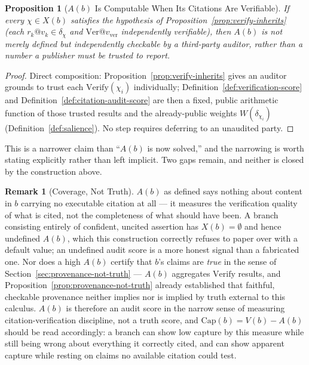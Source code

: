 \documentclass[11pt]{article}
\newtheorem{proposition}[theorem]{Proposition}
\theoremstyle{definition}
\newtheorem{remark}[theorem]{Remark}
\begin{document}
\begin{proposition}[$A(b)$ Is Computable When Its Citations Are Verifiable]
\label{prop:audit-computable}
If every $\chi \in X(b)$ satisfies the hypothesis of Proposition~\ref{prop:verify-inherits} (each $r_k@v_k \in \delta_\chi$ and $\mathrm{Ver}@v_{\mathrm{ver}}$ independently verifiable), then $A(b)$ is not merely defined but independently checkable by a third-party auditor, rather than a number a publisher must be trusted to report.
\end{proposition}
\begin{proof}
Direct composition: Proposition~\ref{prop:verify-inherits} gives an auditor grounds to trust each $\mathrm{Verify}(\chi_i)$ individually; Definition~\ref{def:verification-score} and Definition~\ref{def:citation-audit-score} are then a fixed, public arithmetic function of those trusted results and the already-public weights $W(\delta_{\chi_i})$ (Definition~\ref{def:salience}). No step requires deferring to an unaudited party.
\end{proof}

This is a narrower claim than ``$A(b)$ is now solved,'' and the narrowing is worth stating explicitly rather than left implicit. Two gaps remain, and neither is closed by the construction above.

\begin{remark}[Coverage, Not Truth]
\label{rem:coverage-not-truth}
$A(b)$ as defined says nothing about content in $b$ carrying no executable citation at all --- it measures the verification quality of what is cited, not the completeness of what should have been. A branch consisting entirely of confident, uncited assertion has $X(b) = \emptyset$ and hence undefined $A(b)$, which this construction correctly refuses to paper over with a default value; an undefined audit score is a more honest signal than a fabricated one. Nor does a high $A(b)$ certify that $b$'s claims are \emph{true} in the sense of Section~\ref{sec:provenance-not-truth} --- $A(b)$ aggregates $\mathrm{Verify}$ results, and Proposition~\ref{prop:provenance-not-truth} already established that faithful, checkable provenance neither implies nor is implied by truth external to this calculus. $A(b)$ is therefore an audit score in the narrow sense of measuring citation-verification discipline, not a truth score, and $\mathrm{Cap}(b) = V(b) - A(b)$ should be read accordingly: a branch can show low capture by this measure while still being wrong about everything it correctly cited, and can show apparent capture while resting on claims no available citation could test.
\end{remark}
\end{document}
